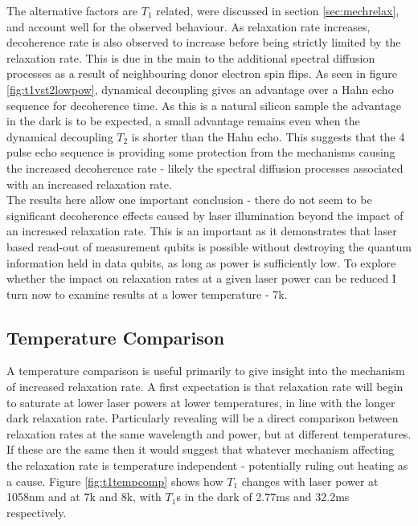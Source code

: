 The alternative factors are $T_1$ related, were discussed in section \ref{sec:mechrelax}, and account well for the observed behaviour.
As relaxation rate increases, decoherence rate is also observed to increase before being strictly limited by the relaxation rate.
This is due in the main to the additional spectral diffusion processes as a result of neighbouring donor electron spin flips. 
As seen in figure \ref{fig:t1vst2lowpow}, dynamical decoupling gives an advantage over a Hahn echo sequence for decoherence time. 
As this is a natural silicon sample the advantage in the dark is to be expected, a small advantage remains even when the dynamical decoupling $T_2$ is shorter than the Hahn echo.
This suggests that the 4 pulse echo sequence is providing some protection from the mechanisms causing the increased decoherence rate - likely the spectral diffusion processes associated with an increased relaxation rate.
\\
The results here allow one important conclusion - there do not seem to be significant decoherence effects caused by laser illumination beyond the impact of an increased relaxation rate.
This is an important as it demonstrates that laser based read-out of measurement qubits is possible without destroying the quantum information held in data qubits, as long as power is sufficiently low.
To explore whether the impact on relaxation rates at a given laser power can be reduced I turn now to examine results at a lower temperature - 7k.

\subsection{Temperature Comparison}

A temperature comparison is useful primarily to give insight into the mechanism of increased relaxation rate.
A first expectation is that relaxation rate will begin to saturate at lower laser powers at lower temperatures, in line with the longer dark relaxation rate.
Particularly revealing will be a direct comparison between relaxation rates at the same wavelength and power, but at different temperatures.
If these are the same then it would suggest that whatever mechanism affecting the relaxation rate is temperature independent - potentially ruling out heating as a cause.
Figure \ref{fig:t1tempcomp} shows how $T_1$ changes with laser power at 1058nm and at 7k and 8k, with $T_1$s in the dark of 2.77ms and 32.2ms respectively.

